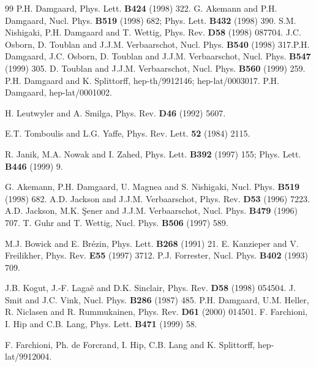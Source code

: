 \documentclass[11pt]{article}
\begin{document}
\begin{thebibliography}{99}
P.H. Damgaard, Phys. Lett. {\bf B424} (1998) 322.\newline
G. Akemann and P.H. Damgaard, Nucl. Phys. {\bf B519} (1998) 682;
Phys. Lett. {\bf B432} (1998) 390. \newline S.M. Nishigaki, P.H. Damgaard 
and T. Wettig, Phys. Rev. {\bf D58} (1998) 087704.
J.C. Osborn, D. Toublan and J.J.M. Verbaarschot, Nucl. Phys. 
{\bf B540} (1998) 317.\newline P.H. Damgaard, J.C. Osborn, D. Toublan and
J.J.M. Verbaarschot, Nucl. Phys. {\bf B547} (1999) 305.
\newline D. Toublan and J.J.M. Verbaarschot, Nucl. Phys. {\bf B560} (1999) 259.
P.H. Damgaard and K. Splittorff, hep-th/9912146;
hep-lat/0003017. \newline
P.H. Damgaard, hep-lat/0001002. 

H. Leutwyler and A. Smilga, Phys. Rev. {\bf D46} (1992) 5607.


 E.T. Tomboulis and L.G. Yaffe, Phys. Rev. Lett.
{\bf 52} (1984) 2115.

R. Janik, M.A. Nowak and I. Zahed, Phys. Lett. {\bf B392} (1997)
155; Phys. Lett. {\bf B446} (1999) 9.

G. Akemann, P.H. Damgaard, U. Magnea and S. Nishigaki,
Nucl. Phys. {\bf B519} (1998) 682.
A.D. Jackson and J.J.M. Verbaarschot,  Phys. Rev. {\bf D53} 
(1996) 7223. \newline
A.D. Jackson, M.K. \c Sener and J.J.M. Verbaarschot, Nucl. Phys. {\bf B479}
(1996) 707.\newline
T. Guhr and T. Wettig, Nucl. Phys. {\bf B506} (1997) 589.

 M.J. Bowick and E. Br\'ezin, Phys. Lett.  {\bf B268} (1991)
21. \newline
E. Kanzieper and V. Freilikher, Phys. Rev. {\bf E55} (1997) 3712.
 P.J. Forrester, Nucl. Phys. {\bf B402} (1993) 709.

 J.B. Kogut, J.-F. Laga\"e and D.K. Sinclair,
Phys. Rev. {\bf D58} (1998) 054504.
 J. Smit and J.C. Vink, Nucl. Phys. {\bf B286} (1987) 485.
P.H. Damgaard, U.M. Heller, R. Niclasen and R. Rummukainen,
Phys. Rev. {\bf D61} (2000) 014501.
F. Farchioni, I. Hip and C.B. Lang, Phys. Lett. {\bf B471} 
(1999) 58.

 F. Farchioni, Ph. de Forcrand, I. Hip, C.B. Lang and 
K. Splittorff, hep-lat/9912004.


\end{thebibliography}
\end{document}
